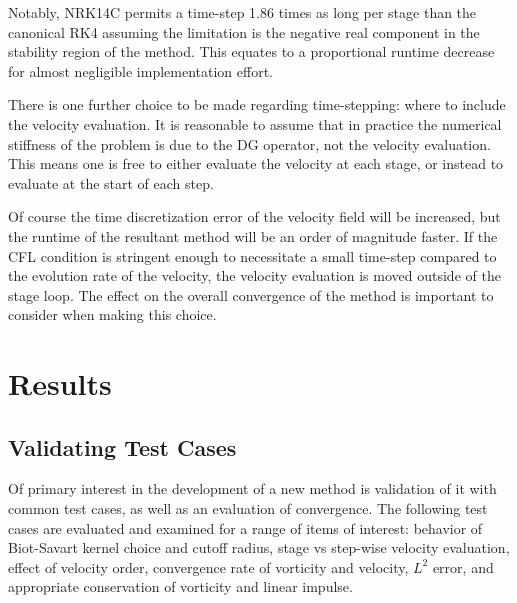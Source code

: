 \documentclass[letterpaper,12pt]{report}
\begin{document}
Notably, NRK14C permits a time-step 1.86 times as long per stage than the canonical RK4 assuming the limitation is the negative real component in the stability region of the method. This equates to a proportional runtime decrease for almost negligible implementation effort. 

There is one further choice to be made regarding time-stepping: where to include the velocity evaluation. It is reasonable to assume that in practice the numerical stiffness of the problem is due to the DG operator, not the velocity evaluation. This means one is free to either evaluate the velocity at each stage, or instead to evaluate at the start of each step. 

Of course the time discretization error of the velocity field will be increased, but the runtime of the resultant method will be an order of magnitude faster. If the CFL condition is stringent enough to necessitate a small time-step compared to the evolution rate of the velocity, the velocity evaluation is moved outside of the stage loop. The effect on the overall convergence of the method is important to consider when making this choice.

\chapter{Results}
\section{Validating Test Cases}
Of primary interest in the development of a new method is validation of it with common test cases, as well as an evaluation of convergence. The following test cases are evaluated and examined for a range of items of interest: behavior of Biot-Savart kernel choice and cutoff radius, stage vs step-wise velocity evaluation, effect of velocity order, convergence rate of vorticity and velocity, $L^2$ error, and appropriate conservation of vorticity and linear impulse.
\end{document}
